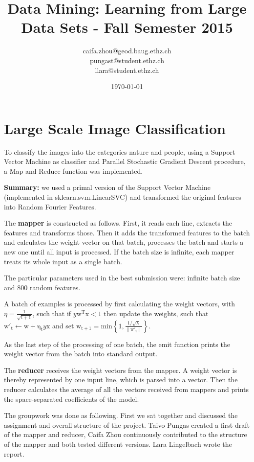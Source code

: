 \documentclass[a4paper, 11pt]{article}
\title{Data Mining: Learning from Large Data Sets - Fall Semester 2015}
\author{caifa.zhou@geod.baug.ethz.ch\\ pungast@student.ethz.ch\\ llara@student.ethz.ch\\}
\date{\today}
\begin{document}
\maketitle

\section*{Large Scale Image Classification} 
To classify the images into the categories nature and people, using a Support Vector Machine as classifier and Parallel Stochastic Gradient Descent procedure, a Map and Reduce function was implemented. 

\textbf{Summary:} we used a primal version of the Support Vector Machine (implemented in sklearn.svm.LinearSVC) and transformed the original features into Random Fourier Features.

The \textbf{mapper} is constructed as follows. First, it reads each line, extracts the features and transforms those. Then it adds the transformed features to the batch and calculates the weight vector on that batch, processes the batch and starts a new one until all input is processed. If the batch size is infinite, each mapper treats its whole input as a single batch.

The particular parameters used in the best submission were: infinite batch size and 800 random features.

A batch of examples is processed by first calculating the weight vectors, with $\eta = \frac{1}{\sqrt{t +1}}$, such that if $y\mathrm{w^{T}x} < 1$ then update the weights, such that $\mathrm{w'_{t}} \leftarrow\mathrm{w + \eta _{t}}y \mathrm{x}$ and set $\mathrm{w_{t+1}} = \mathrm{min \left \{1,\frac{1/\sqrt{\lambda }}{\left \| w'_{t} \right \|} \right \}}$.

As the last step of the processing of one batch, the emit function prints the weight vector from the batch into standard output.

The \textbf{reducer} receives the weight vectors from the mapper. A weight vector is thereby represented by one input line, which is parsed into a vector. Then the reducer calculates the average of all the vectors received from mappers and prints the space-separated coefficients of the model.

The groupwork was done as following. First we sat together and discussed the assignment and overall structure of the project. Taivo Pungas created a first draft of the mapper and reducer, Caifa Zhou continuously contributed to the structure of the mapper and both tested different versions. Lara Lingelbach wrote the report. 
\end{document}
